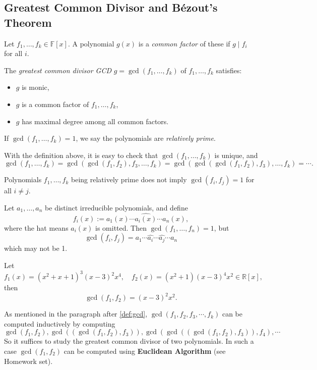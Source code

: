 \subsection{Greatest Common Divisor and B\'ezout's Theorem}
\begin{definition} \label{def:gcd}
Let \(f_1, \dots, f_k \in \mathbb{F}[x]\). A polynomial \(g(x)\) is a \emph{common factor} of these if \(g \mid f_i\) for all \(i\).

The \emph{greatest common divisor {GCD}} \(g = \gcd(f_1, \dots, f_k)\) of $f_1, \dots, f_k$ satisfies:
\begin{itemize}
    \item \(g\) is monic,
    \item \(g\) is a common factor of \(f_1, \dots, f_k\),
    \item \(g\) has maximal degree among all common factors.
\end{itemize}
If \(\gcd(f_1, \dots, f_k) = 1\), we say the polynomials are \emph{relatively prime}.
\end{definition}
With the definition above, it is easy to check that \(\gcd(f_1, \dots, f_k)\) is unique, and 
\[\gcd(f_1, \dots, f_k) = \gcd(\gcd(f_1, f_2), f_3, \dots, f_k) = \gcd(\gcd(\gcd(f_1, f_2), f_3), \dots, f_k) = \cdots.\]


\begin{remark}
Polynomials \(f_1, \dots, f_k\) being relatively prime does not imply \(\gcd(f_i, f_j) = 1\) for all \(i \neq j\).
\end{remark}

\begin{example}
Let \(a_1, \dots, a_n\) be distinct irreducible polynomials, and define
\[
f_i(x) := a_1(x) \cdots \widehat{a_i(x)} \cdots a_n(x),
\]
where the hat means \(a_i(x)\) is omitted. Then \(\gcd(f_1, \dots, f_n) = 1\), but
\[
\gcd(f_i, f_j) = a_1 \cdots \widehat{a_i} \cdots \widehat{a_j} \cdots a_n
\]
which may not be 1.
\end{example}

\begin{example}
Let 
\[
f_1(x) = (x^2 + x + 1)^3 (x - 3)^2 x^4, \quad
f_2(x) = (x^2 + 1)(x - 3)^4 x^2 \in \mathbb{R}[x],
\]
then
\[
\gcd(f_1, f_2) = (x - 3)^2 x^2.
\]
\end{example}


As mentioned in the paragraph after \autoref{def:gcd}, \(\gcd(f_1, f_2, f_3, \cdots,f_k)\) can be computed inductively by computing
$$\gcd(f_1, f_2), \gcd((\gcd(f_1,f_2),f_3)), \gcd(\gcd((\gcd(f_1,f_2),f_3)),f_4), \cdots$$
So it suffices to study the greatest common divisor of two polynomials. In such a case $\gcd(f_1, f_2)$ can be computed using {\bf Euclidean Algorithm} (see Homework set).

